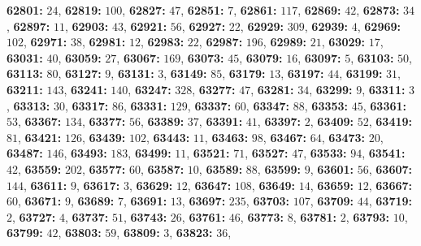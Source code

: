 \textsf{\bfseries 62801:} $24$, \textsf{\bfseries 62819:} $100$, \textsf{\bfseries 62827:} $47$, \textsf{\bfseries 62851:} $7$, \textsf{\bfseries 62861:} $117$, \textsf{\bfseries 62869:} $42$, \textsf{\bfseries 62873:} $34$, \textsf{\bfseries 62897:} $11$, \textsf{\bfseries 62903:} $43$, \textsf{\bfseries 62921:} $56$, \textsf{\bfseries 62927:} $22$, \textsf{\bfseries 62929:} $309$, \textsf{\bfseries 62939:} $4$, \textsf{\bfseries 62969:} $102$, \textsf{\bfseries 62971:} $38$, \textsf{\bfseries 62981:} $12$, \textsf{\bfseries 62983:} $22$, \textsf{\bfseries 62987:} $196$, \textsf{\bfseries 62989:} $21$, \textsf{\bfseries 63029:} $17$, \textsf{\bfseries 63031:} $40$, \textsf{\bfseries 63059:} $27$, \textsf{\bfseries 63067:} $169$, \textsf{\bfseries 63073:} $45$, \textsf{\bfseries 63079:} $16$, \textsf{\bfseries 63097:} $5$, \textsf{\bfseries 63103:} $50$, \textsf{\bfseries 63113:} $80$, \textsf{\bfseries 63127:} $9$, \textsf{\bfseries 63131:} $3$, \textsf{\bfseries 63149:} $85$, \textsf{\bfseries 63179:} $13$, \textsf{\bfseries 63197:} $44$, \textsf{\bfseries 63199:} $31$, \textsf{\bfseries 63211:} $143$, \textsf{\bfseries 63241:} $140$, \textsf{\bfseries 63247:} $328$, \textsf{\bfseries 63277:} $47$, \textsf{\bfseries 63281:} $34$, \textsf{\bfseries 63299:} $9$, \textsf{\bfseries 63311:} $3$, \textsf{\bfseries 63313:} $30$, \textsf{\bfseries 63317:} $86$, \textsf{\bfseries 63331:} $129$, \textsf{\bfseries 63337:} $60$, \textsf{\bfseries 63347:} $88$, \textsf{\bfseries 63353:} $45$, \textsf{\bfseries 63361:} $53$, \textsf{\bfseries 63367:} $134$, \textsf{\bfseries 63377:} $56$, \textsf{\bfseries 63389:} $37$, \textsf{\bfseries 63391:} $41$, \textsf{\bfseries 63397:} $2$, \textsf{\bfseries 63409:} $52$, \textsf{\bfseries 63419:} $81$, \textsf{\bfseries 63421:} $126$, \textsf{\bfseries 63439:} $102$, \textsf{\bfseries 63443:} $11$, \textsf{\bfseries 63463:} $98$, \textsf{\bfseries 63467:} $64$, \textsf{\bfseries 63473:} $20$, \textsf{\bfseries 63487:} $146$, \textsf{\bfseries 63493:} $183$, \textsf{\bfseries 63499:} $11$, \textsf{\bfseries 63521:} $71$, \textsf{\bfseries 63527:} $47$, \textsf{\bfseries 63533:} $94$, \textsf{\bfseries 63541:} $42$, \textsf{\bfseries 63559:} $202$, \textsf{\bfseries 63577:} $60$, \textsf{\bfseries 63587:} $10$, \textsf{\bfseries 63589:} $88$, \textsf{\bfseries 63599:} $9$, \textsf{\bfseries 63601:} $56$, \textsf{\bfseries 63607:} $144$, \textsf{\bfseries 63611:} $9$, \textsf{\bfseries 63617:} $3$, \textsf{\bfseries 63629:} $12$, \textsf{\bfseries 63647:} $108$, \textsf{\bfseries 63649:} $14$, \textsf{\bfseries 63659:} $12$, \textsf{\bfseries 63667:} $60$, \textsf{\bfseries 63671:} $9$, \textsf{\bfseries 63689:} $7$, \textsf{\bfseries 63691:} $13$, \textsf{\bfseries 63697:} $235$, \textsf{\bfseries 63703:} $107$, \textsf{\bfseries 63709:} $44$, \textsf{\bfseries 63719:} $2$, \textsf{\bfseries 63727:} $4$, \textsf{\bfseries 63737:} $51$, \textsf{\bfseries 63743:} $26$, \textsf{\bfseries 63761:} $46$, \textsf{\bfseries 63773:} $8$, \textsf{\bfseries 63781:} $2$, \textsf{\bfseries 63793:} $10$, \textsf{\bfseries 63799:} $42$, \textsf{\bfseries 63803:} $59$, \textsf{\bfseries 63809:} $3$, \textsf{\bfseries 63823:} $36$, 
